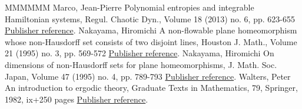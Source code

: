 \documentclass[11pt]{article}
\theoremstyle{definition}
\numberwithin{equation}{section}
\numberwithin{figure}{section}
\numberwithin{table}{section}
\begin{document}
\begin{thebibliography}{MMMMMM}
 Marco, Jean-Pierre Polynomial entropies and integrable Hamiltonian systems, Regul. Chaotic Dyn., Volume 18 (2013) no. 6, pp. 623-655 \href{https://ahl.centre-mersenne.org/item/AHL_2019__2__39_0/#Mar13}{Publisher reference}.
 Nakayama, Hiromichi A non-flowable plane homeomorphism whose non-Hausdorff set consists of two disjoint lines, Houston J. Math., Volume 21 (1995) no. 3, pp. 569-572 \href{https://ahl.centre-mersenne.org/item/AHL_2019__2__39_0/#Nak95}{Publisher reference}.
 Nakayama, Hiromichi On dimensions of non-Hausdorff sets for plane homeomorphisms, J. Math. Soc. Japan, Volume 47 (1995) no. 4, pp. 789-793 \href{https://ahl.centre-mersenne.org/item/AHL_2019__2__39_0/#Nak95b}{Publisher reference}.
 Walters, Peter An introduction to ergodic theory, Graduate Texts in Mathematics, 79, Springer, 1982, ix+250 pages \href{https://ahl.centre-mersenne.org/item/AHL_2019__2__39_0/#Wal82}{Publisher reference}.
\end{thebibliography}
\end{document}
